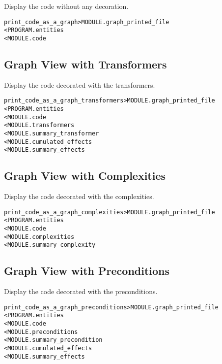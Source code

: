 \documentclass[a4paper]{report}
\newenvironment{PipsMake}{\begin{alltt}}{\end{alltt}}
\begin{document}
Display the code without any decoration.

\begin{PipsMake}
print_code_as_a_graph                      > MODULE.graph_printed_file
        < PROGRAM.entities
        < MODULE.code
\end{PipsMake}

\subsection{Graph View with Transformers}

Display the code decorated with the transformers.

\begin{PipsMake}
print_code_as_a_graph_transformers         > MODULE.graph_printed_file
        < PROGRAM.entities
        < MODULE.code
        < MODULE.transformers
        < MODULE.summary_transformer
        < MODULE.cumulated_effects
        < MODULE.summary_effects
\end{PipsMake}

\subsection{Graph View with Complexities}

Display the code decorated with the complexities.

\begin{PipsMake}
print_code_as_a_graph_complexities         > MODULE.graph_printed_file
        < PROGRAM.entities
        < MODULE.code
        < MODULE.complexities
        < MODULE.summary_complexity
\end{PipsMake}

\subsection{Graph View with Preconditions}

Display the code decorated with the preconditions.

\begin{PipsMake}
print_code_as_a_graph_preconditions        > MODULE.graph_printed_file
        < PROGRAM.entities
        < MODULE.code
        < MODULE.preconditions
        < MODULE.summary_precondition
        < MODULE.cumulated_effects
        < MODULE.summary_effects
\end{PipsMake}
\end{document}
